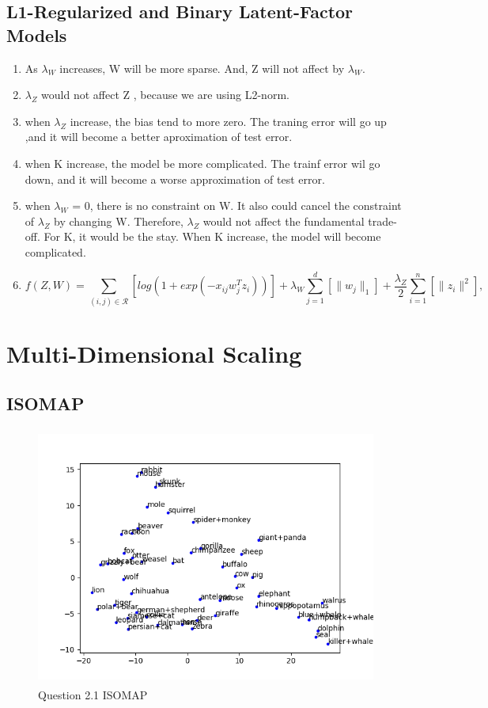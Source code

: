 \documentclass{article}
\def\norm#1{\|#1\|}
\def\enum#1{\begin{enumerate}#1\end{enumerate}}
\begin{document}
\subsection{L1-Regularized and Binary Latent-Factor Models}

\enum{
\item As $\lambda_W$ increases, W will be more sparse. And, Z will not affect by $\lambda_W$.
\item $\lambda_Z$ would not affect Z , because we are using L2-norm.
\item when $\lambda_Z$ increase,  the bias tend to more zero. The traning error will go up ,and it will become a better aproximation of test error.
\item when K increase, the model be more complicated. The trainf error wil go down, and it will become a worse approximation of test error.
\item when $\lambda_W$ = 0, there is no constraint on W. It also could cancel the constraint of $\lambda_Z$ by changing W. Therefore, $\lambda_Z$ would not affect the fundamental trade-off. For K, it would be the stay. When K increase, the model will become complicated.
\item \[
f(Z,W) = \sum_{(i,j) \in \mathcal{R}}\left[log(1 + exp(-x_{ij} w_j^Tz_i )) \right] + \lambda_W \sum_{j=1}^d \left[\norm{w_j}_1\right] + \frac{\lambda_Z}{2} \sum_{i=1}^n \left[\norm{z_i}^2\right],
\]
}



\section{Multi-Dimensional Scaling}

\subsection{ISOMAP}

\begin{figure}[h!]
    \includegraphics[width=50em,height=8.5cm]{q2_1.png}
    \caption{Question 2.1 ISOMAP}
    \label{fig:q2_1}
\end{figure}
\end{document}
